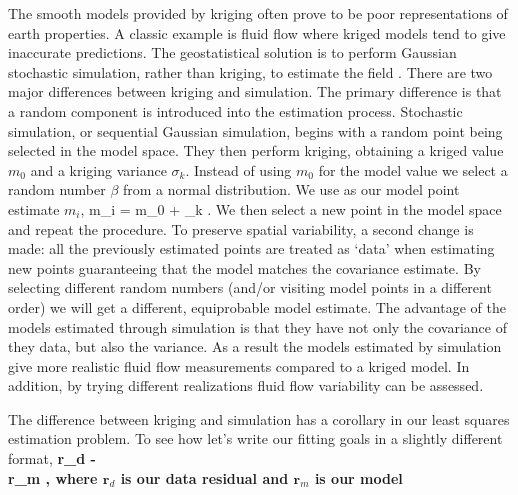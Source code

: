 
The smooth models provided by kriging  often prove
to be poor representations of earth properties.
A classic example is fluid flow where kriged models  tend to give inaccurate
predictions. The geostatistical solution
is to perform Gaussian stochastic simulation, rather than kriging, to
estimate the field \cite[]{geostat2}.
There are two major  differences between kriging and simulation. 
The primary difference
is that a random component is introduced into the estimation process.   
Stochastic simulation, or  sequential Gaussian simulation, begins
with a random point being selected in the model space.
They then perform kriging, obtaining
a kriged value $m_0$ and  a kriging variance $\sigma_k$.
Instead of using $m_0$ for the model value we
select a  random number $\beta$
from a  normal distribution.
We use as our model point estimate $m_i$,
\beq
m_i = m_0 + \sigma_k \beta.
\eeq
We then select a new point in the model space and repeat the procedure.
To preserve spatial variability,  a second change is made: 
all the previously estimated points are treated as `data' when estimating
new points guaranteeing that the model matches the covariance estimate. 
By selecting different random numbers (and/or visiting model points
in a different order)  we will get a different, equiprobable model
estimate.
The advantage of the models estimated through simulation is that they
have not only the covariance of they data, but also the variance.
As a result the models estimated by simulation
give more realistic fluid flow measurements compared to a kriged model.
In addition, by trying different realizations fluid flow variability
can be assessed.
\par
%
%
%
%
%
%
%
%
%
The difference between kriging and simulation has a corollary in our
least squares estimation problem. To see how let's write
our fitting goals in a slightly different format,
\beqa
\bf r_d \pox {}  -     \nonumber \\ 
\bf r_m \pox \epsilon \reg {}\label{eq:rbar},
\eeqa
where $\mathbf{r}_d$ is our data residual and $\mathbf{r}_m$ is our model
